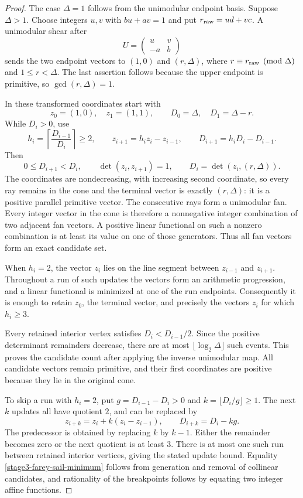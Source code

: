 \documentclass[11pt,a4paper]{article}
\theoremstyle{definition}
\theoremstyle{remark}
\begin{document}
\begin{proof}
The case $\Delta=1$ follows from the unimodular endpoint basis. Suppose
$\Delta>1$. Choose integers $u,v$ with $bu+av=1$ and put
$r_{\rm raw}=ud+vc$. A unimodular shear after
\[
 U=\begin{pmatrix}u&v\\-a&b\end{pmatrix}
\]
sends the two endpoint vectors to $(1,0)$ and $(r,\Delta)$, where
$r\equiv r_{\rm raw}\pmod\Delta$ and $1\le r<\Delta$.
The last assertion follows because the upper endpoint is primitive,
so $\gcd(r,\Delta)=1$.

In these transformed coordinates start with
\[
 z_0=(1,0),\quad z_1=(1,1),\qquad
 D_0=\Delta,\quad D_1=\Delta-r.
\]
While $D_i>0$, use
\[
 h_i=\left\lceil\frac{D_{i-1}}{D_i}\right\rceil\ge2,\qquad
 z_{i+1}=h_i z_i-z_{i-1},\qquad
 D_{i+1}=h_iD_i-D_{i-1}.
\]
Then
\[
 0\le D_{i+1}<D_i,\qquad
 \det(z_i,z_{i+1})=1,\qquad
 D_i=\det(z_i,(r,\Delta)).
\]
The coordinates are nondecreasing, with increasing second coordinate,
so every ray remains in the cone and the terminal vector is exactly
$(r,\Delta)$: it is a positive parallel primitive vector.
The consecutive rays form a unimodular fan. Every integer vector in
the cone is therefore a nonnegative integer combination of two adjacent
fan vectors. A positive linear functional on such a nonzero combination
is at least its value on one of those generators. Thus all fan vectors
form an exact candidate set.

When $h_i=2$, the vector $z_i$ lies on the line segment between
$z_{i-1}$ and $z_{i+1}$. Throughout a run of such updates the vectors
form an arithmetic progression, and a linear functional is minimized
at one of the run endpoints. Consequently it is enough to retain
$z_0$, the terminal vector, and precisely the vectors $z_i$ for which
$h_i\ge3$.

Every retained interior vertex satisfies
$D_i<D_{i-1}/2$. Since the positive determinant remainders decrease,
there are at most $\lfloor\log_2\Delta\rfloor$ such events.
This proves the candidate count after applying the inverse unimodular
map. All candidate vectors remain primitive, and their first coordinates
are positive because they lie in the original cone.

To skip a run with $h_i=2$, put $g=D_{i-1}-D_i>0$ and
$k=\lfloor D_i/g\rfloor\ge1$. The next $k$ updates all have quotient $2$,
and can be replaced by
\[
 z_{i+k}=z_i+k(z_i-z_{i-1}),\qquad D_{i+k}=D_i-kg.
\]
The predecessor is obtained by replacing $k$ by $k-1$. Either the
remainder becomes zero or the next quotient is at least $3$.
There is at most one such run between retained interior vertices,
giving the stated update bound. Equality
\eqref{stage3-farey-sail-minimum} follows from generation and removal of
collinear candidates, and rationality of the breakpoints follows by
equating two integer affine functions.
\end{proof}
\end{document}
